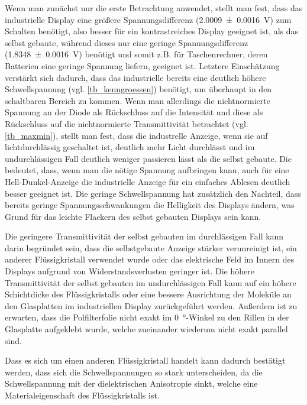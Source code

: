 \documentclass[
	a4paper,
	12pt,
	pagesize,
	ngerman
]{scrartcl}
\begin{document}
	Wenn man zunächst nur die erste Betrachtung anwendet, stellt man fest, dass das industrielle Display eine größere Spannungsdifferenz (\SI{2.0009+-0.0016}{V}) zum Schalten benötigt, also besser für ein kontrastreiches Display geeignet ist, als das selbst gebaute, während dieses nur eine geringe Spannungsdifferenz (\SI{1.8348+-0.0016}{V}) benötigt und somit z.B. für Taschenrechner, deren Batterien eine geringe Spannung liefern, geeignet ist.
	Letztere Einschätzung verstärkt sich dadurch, dass das industrielle bereits eine deutlich höhere Schwellspannung (vgl. \cref{tb_kenngroessen}) benötigt, um überhaupt in den schaltbaren Bereich zu kommen.
	Wenn man allerdings die nichtnormierte Spannung an der Diode als Rückschluss auf die Intensität und diese als Rückschluss auf die nichtnormierte Transmittivität betrachtet (vgl. \cref{tb_maxmin}), stellt man fest, dass die industrelle Anzeige, wenn sie auf lichtdurchlässig geschaltet ist, deutlich mehr Licht durchlässt und im undurchlässigen Fall deutlich weniger passieren lässt als die selbst gebaute.
	Die bedeutet, dass, wenn man die nötige Spannung aufbringen kann, auch für eine Hell-Dunkel-Anzeige die industrielle Anzeige für ein einfaches Ablesen deutlich besser geeignet ist.
	Die geringe Schwellspannung hat zusätzlich den Nachteil, dass bereits geringe Spannungsschwankungen die Helligkeit des Displays ändern, was Grund für das leichte Flackern des selbst gebauten Displays sein kann. %

	Die geringere Transmittivität der selbst gebauten im durchlässigen Fall kann darin begründet sein, dass die selbstgebaute Anzeige stärker verunreinigt ist, ein anderer Flüssigkristall verwendet wurde oder das elektrische Feld im Innern des Displays aufgrund von Widerstandsverlusten geringer ist.
	Die höhere Transmittivität der selbst gebauten im undurchlässigen Fall kann auf ein höhere Schichtdicke des Flüssigkristalls oder eine bessere Ausrichtung der Moleküle an den Glasplatten im industriellen Display zurückgeführt werden.
	Außerdem ist zu erwarten, dass die Polfilterfolie nicht exakt im \SI{0}{\degree}-Winkel zu den Rillen in der Glasplatte aufgeklebt wurde, welche zueinander wiederum nicht exakt parallel sind.

	Dass es sich um einen anderen Flüssigkristall handelt kann dadurch bestätigt werden, dass sich die Schwellspannungen so stark unterscheiden, da die Schwellspannung mit der dielektrischen Anisotropie sinkt, welche eine Materialeigenschaft des Flüssigkristalls ist.
\end{document}
